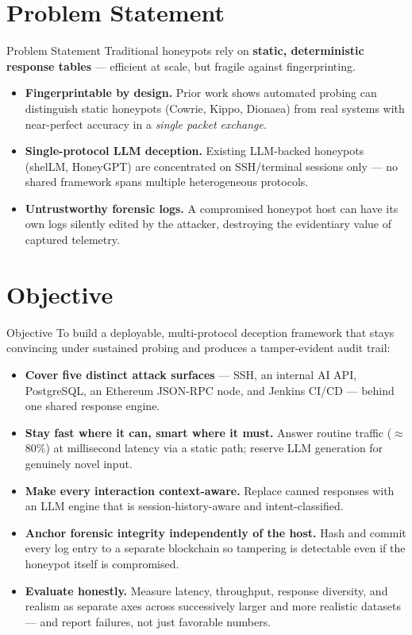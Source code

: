 \documentclass[aspectratio=169, 11pt]{beamer}
\begin{document}
\section{Problem Statement}
\begin{frame}{Problem Statement}
    Traditional honeypots rely on \textbf{static, deterministic response tables} --- efficient at scale, but fragile against fingerprinting.
    \begin{itemize}
        \item \textbf{Fingerprintable by design.} Prior work shows automated probing can distinguish static honeypots (Cowrie, Kippo, Dionaea) from real systems with near-perfect accuracy in a \emph{single packet exchange}.
        \vspace{2mm}
        \item \textbf{Single-protocol LLM deception.} Existing LLM-backed honeypots (shelLM, HoneyGPT) are concentrated on SSH/terminal sessions only --- no shared framework spans multiple heterogeneous protocols.
        \vspace{2mm}
        \item \textbf{Untrustworthy forensic logs.} A compromised honeypot host can have its own logs silently edited by the attacker, destroying the evidentiary value of captured telemetry.
    \end{itemize}
\end{frame}

\section{Objective}
\begin{frame}{Objective}
    To build a deployable, multi-protocol deception framework that stays convincing under sustained probing and produces a tamper-evident audit trail:
    \begin{itemize}
        \item \textbf{Cover five distinct attack surfaces} --- SSH, an internal AI API, PostgreSQL, an Ethereum JSON-RPC node, and Jenkins CI/CD --- behind one shared response engine.
        \item \textbf{Stay fast where it can, smart where it must.} Answer routine traffic ($\approx$80\%) at millisecond latency via a static path; reserve LLM generation for genuinely novel input.
        \item \textbf{Make every interaction context-aware.} Replace canned responses with an LLM engine that is session-history-aware and intent-classified.
        \item \textbf{Anchor forensic integrity independently of the host.} Hash and commit every log entry to a separate blockchain so tampering is detectable even if the honeypot itself is compromised.
        \item \textbf{Evaluate honestly.} Measure latency, throughput, response diversity, and realism as separate axes across successively larger and more realistic datasets --- and report failures, not just favorable numbers.
    \end{itemize}
\end{frame}
\end{document}

